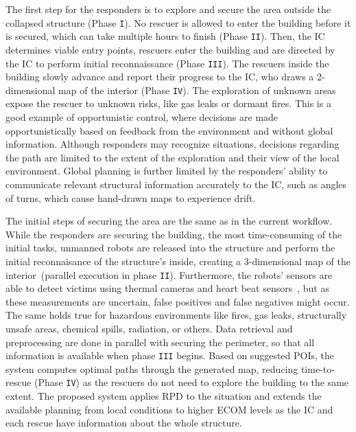 \documentclass{egpubl}
\begin{document}
 The first step for the responders is to explore and secure the area outside the collapsed structure (Phase \texttt{I}). No rescuer is allowed to enter the building before it is secured, which can take multiple hours to finish (Phase \texttt{II}). Then, the IC determines viable entry points, rescuers enter the building and are directed by the IC to perform initial reconnaissance (Phase \texttt{III}). The rescuers inside the building slowly advance and report their progress to the IC, who draws a 2-dimensional map of the interior (Phase \texttt{IV}). The exploration of unknown areas expose the rescuer to unknown risks, like gas leaks or dormant fires. This is a good example of opportunistic control, where decisions are made opportunistically based on feedback from the environment and without global information. Although responders may recognize situations, decisions regarding the path are limited to the extent of the exploration and their view of the local environment. Global planning is further limited by the responders' ability to communicate relevant structural information accurately to the IC, such as angles of turns, which cause hand-drawn maps to experience drift.

 The initial steps of securing the area are the same as in the current workflow. While the responders are securing the building, the most time-consuming of the initial tasks, unmanned robots are released into the structure and perform the initial reconnaisance of the structure's inside, creating a 3-dimensional map of the interior~(parallel execution in phase \texttt{II}). Furthermore, the robots' sensors are able to detect victims using thermal cameras and heart beat sensors~\cite{6027084}, but as these measurements are uncertain, false positives and false negatives might occur. The same holds true for hazardous environments like fires, gas leaks, structurally unsafe areas, chemical spills, radiation, or others. Data retrieval and preprocessing are done in parallel with securing the perimeter, so that all information is available when phase \texttt{III} begins. Based on suggested POIs, the system computes optimal paths through the generated map, reducing time-to-rescue (Phase \texttt{IV}) as the rescuers do not need to explore the building to the same extent. The proposed system applies RPD to the situation and extends the available planning from local conditions to higher ECOM levels as the IC and each rescue have information about the whole structure.
\end{document}
